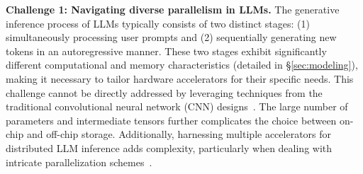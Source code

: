 \noindent\textbf{Challenge 1: Navigating diverse parallelism in LLMs.}
The generative inference process of LLMs typically consists of two distinct stages: (1) simultaneously processing user prompts and (2) sequentially generating new tokens in an autoregressive manner.
These two stages exhibit significantly different computational and memory characteristics (detailed in \S\ref{sec:modeling}), making it necessary to tailor hardware accelerators for their specific needs.
This challenge cannot be directly addressed by leveraging techniques from the traditional convolutional neural network (CNN) designs~\cite{kim2023survey,zhang2015cnnfpga}.
The large number of parameters and intermediate tensors further complicates the choice between on-chip and off-chip storage.
Additionally, harnessing multiple accelerators for distributed LLM inference adds complexity, particularly when dealing with intricate parallelization schemes~\cite{shoeybi2019megatron,narayanan2019pipedream,hong2022dfx}.

